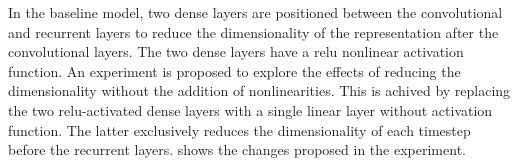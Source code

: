 
In the baseline model, two dense layers are positioned
between the convolutional and recurrent layers to reduce the
dimensionality of the representation after the convolutional
layers. The two dense layers have a \gls{relu} nonlinear
activation function. An experiment is proposed to explore
the effects of reducing the dimensionality without the
addition of nonlinearities. This is achived by replacing the
two \gls{relu}-activated dense layers with a single linear
layer without activation function. The latter exclusively
reduces the dimensionality of each timestep before the
recurrent layers.  shows the changes
proposed in the experiment. 

